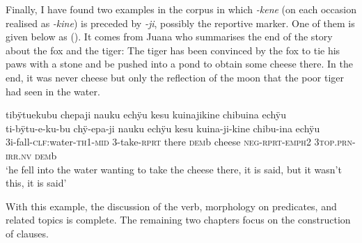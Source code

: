 Finally, I have found two examples in the corpus in which \textit{-kene} (on each occasion realised as \textit{-kine}) is preceded by \textit{-ji}, possibly the reportive marker. One of them is given below as (). It comes from Juana who summarises the end of the story about the fox and the tiger: The tiger has been convinced by the fox to tie his paws with a stone and be pushed into a pond to obtain some cheese there. In the end, it was never cheese but only the reflection of the moon that the poor tiger had seen in the water.

\ea\label{ex:jikine}
\begingl
\glpreamble tibÿtuekubu chepaji nauku echÿu kesu kuinajikine chibuina echÿu\\
\gla ti-bÿtu-e-ku-bu chÿ-epa-ji nauku echÿu kesu kuina-ji-kine chibu-ina echÿu\\
\glb 3i-fall-\textsc{clf:}water-\textsc{th}1-\textsc{mid} 3-take-\textsc{rprt} there \textsc{dem}b cheese \textsc{neg}-\textsc{rprt}-\textsc{emph}2 3\textsc{top.prn}-\textsc{irr.nv} \textsc{dem}b\\
\glft ‘he fell into the water wanting to take the cheese there, it is said, but it wasn’t this, it is said’
\endgl
\trailingcitation{[jmx-n120429ls-x5.263]}
\xe


With this example, the discussion of the verb, morphology on predicates, and related topics is complete. The remaining two chapters focus on the construction of clauses.





